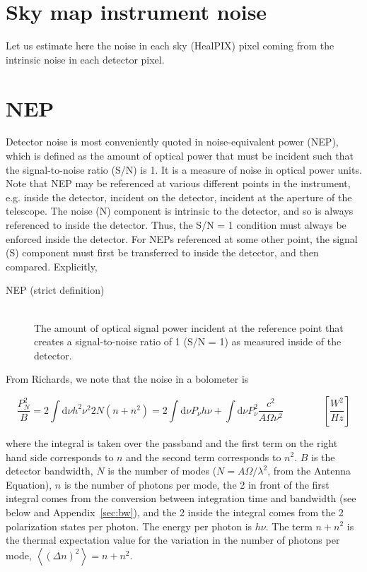 \documentclass[twoside,10pt]{article}
\title{\doctitle}
\author{\myname}
\newcommand{\Avg}[1]{\left< #1 \right>}
\newcommand{\dd}[0]{\mathrm{d}}
\begin{document}
\maketitle

\section{Sky map instrument noise}
\label{sec:noise}

Let us estimate here the noise in each sky (HealPIX) pixel coming from the
intrinsic noise in each detector pixel.

\section{NEP}
\label{sec:nep}

Detector noise is most conveniently quoted in noise-equivalent power (NEP),
which is defined as the amount of optical power that must be incident such
that the signal-to-noise ratio (S/N) is 1. It is a measure of noise in optical
power units. Note that NEP may be referenced at various different points in
the instrument, e.g. inside the detector, incident on the detector, incident
at the aperture of the telescope. The noise (N) component is intrinsic to the
detector, and so is always referenced to inside the detector. Thus, the S/N =
1 condition must always be enforced inside the detector. For NEPs referenced
at some other point, the signal (S) component must first be transferred to
inside the detector, and then compared. Explicitly,

\begin{description}
    \item[NEP (strict definition)] \hfill \\
    The amount of optical signal power incident at the reference
    point that creates a signal-to-noise ratio of 1 (S/N = 1) as measured
    inside of the detector.
\end{description}

From Richards\cite{richards_bolometers_1994}, we note that the noise in a
bolometer is

\begin{equation}
    \label{eq:noisepower}
    \frac{P_N^2}{B} = 2 \int\dd\nu h^2\nu^2 2N(n + n^2) = 2 \int\dd\nu P_\nu h\nu + \int\dd\nu P_\nu^2 \frac{c^2}{A\Omega \nu^2} \qquad\qquad \left[ \frac{\unit{W^2}}{\unit{Hz}} \right]
\end{equation}

where the integral is taken over the passband and the first term on the right
hand side corresponds to $n$ and the second term corresponds to $n^2$. $B$ is
the detector bandwidth, $N$ is the number of modes ($N = A\Omega/\lambda^2$,
from the Antenna Equation), $n$ is the number of photons per mode, the 2 in
front of the first integral comes from the conversion between integration time
and bandwidth (see below and Appendix~\ref{sec:bw}), and the 2 inside the
integral comes from the 2 polarization states per photon. The energy per
photon is $h\nu$. The term $n + n^2$ is the thermal expectation value for the
variation in the number of photons per mode, $\Avg{(\Delta n)^2} = n + n^2$.
\end{document}
